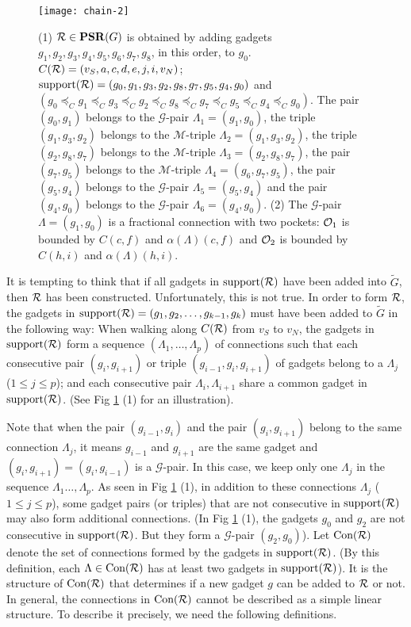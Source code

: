 \documentclass[11pt]{article}
\newcommand{\R}{{\cal R}}
\newcommand{\OO}{{\cal O}}
\newcommand{\MM}{\mathcal{M}}
\newcommand{\GG}{\mathcal{G}}
\newcommand{\CON}{\mbox{Con}}
\newcommand{\PSR}{\mathbf{PSR}}
\begin{document}
\begin{figure}[t]
\begin{center}
\texttt{[image: chain-2]}
  \centering
\caption{(1) $\R \in \PSR(G)$ is obtained by adding gadgets
$g_1, g_2, g_3, g_4, g_5, g_6, g_7,g_8$, in this order, to $g_0$.
$C(\R)=(v_S, a, c, d, e, j, i, v_N)$;
$\mbox{support}(\R) = (g_0, g_1, g_3, g_2, g_8, g_7, g_5, g_4, g_0)$ and
$(g_0 \preceq_C g_1 \preceq_C g_3 \preceq_C g_2 \preceq_C g_8 \preceq_C g_7 \preceq_C g_5 \preceq_C g_4\preceq_C g_0)$.
The pair $(g_0, g_1)$ belongs to the $\GG$-pair $\Lambda_1=(g_1,g_0)$,
the triple $(g_1, g_3, g_2)$ belongs to the $\MM$-triple
$\Lambda_2=(g_1, g_3, g_2)$, the triple $(g_2, g_8, g_7)$ belongs to the
$\MM$-triple $\Lambda_3=(g_2,g_8,g_7)$,
the pair $(g_7,g_5)$ belongs to the $\MM$-triple $\Lambda_4=(g_6,g_7,g_5)$,
the pair $(g_5, g_4)$ belongs to the $\GG$-pair $\Lambda_5=(g_5, g_4)$ and
the pair $(g_4, g_0)$ belongs to the $\GG$-pair $\Lambda_6=(g_4, g_0)$.
(2) The $\GG$-pair $\Lambda=(g_1, g_0)$ is a fractional connection
with two pockets: $\OO_1$ is bounded by $C(c,f)$ and $\alpha(\Lambda)(c,f)$
and $\OO_2$ is bounded by $C(h,i)$ and $\alpha(\Lambda)(h,i)$.
}
\label{fig:chain}
\end{center}
\vspace{-0.2in}
\end{figure}
It is tempting to think that if all gadgets in $\mbox{support}(\R)$ have
been added into $\tilde{G}$, then $\R$ has been constructed. Unfortunately,
this is not true. In order to form $\R$, the gadgets in $\mbox{support}(\R)
=(g_1, g_2,\ldots, g_{k-1}, g_k)$
must have been added to $\tilde{G}$ in the following way: When walking
along $C(\R)$ from $v_S$ to $v_N$, the gadgets in $\mbox{support}(\R)$
form a sequence $(\Lambda_1,\ldots,\Lambda_p)$
of connections such that each consecutive pair $(g_i,g_{i+1})$ or
triple $(g_{i-1},g_i,g_{i+1})$ of gadgets belong to a $\Lambda_j$
($1\leq j\leq p$); and each consecutive pair $\Lambda_i,\Lambda_{i+1}$
share a common gadget in $\mbox{support}(\R)$.
(See Fig \ref{fig:chain} (1) for an illustration).

Note that when the pair $(g_{i-1},g_i)$ and the pair $(g_i,g_{i+1})$
belong to the same connection $\Lambda_j$, it means $g_{i-1}$ and $g_{i+1}$
are the same gadget and $(g_i,g_{i+1})=(g_i,g_{i-1})$ is a $\GG$-pair.
In this case, we keep only one $\Lambda_j$ in the sequence
$\Lambda_1 \ldots, \Lambda_p$.
As seen in Fig \ref{fig:chain} (1), in addition to these connections
$\Lambda_j$ ($1 \leq j\leq p$), some gadget pairs (or triples) that are not
consecutive in $\mbox{support}(\R)$ may also form additional connections.
(In Fig \ref{fig:chain} (1), the gadgets $g_0$ and $g_2$ are not consecutive
in $\mbox{support}(\R)$. But they form a $\GG$-pair $(g_2,g_0)$). Let $\CON(\R)$
denote the set of connections formed by the gadgets in $\mbox{support}(\R)$.
(By this definition, each $\Lambda \in \CON(\R)$ has at least two
gadgets in $\mbox{support}(\R)$).
It is the structure of $\CON(\R)$ that determines if a new gadget $g$ can be
added to $\R$ or not. In general, the connections in $\CON(\R)$ cannot be
described as a simple linear structure. To describe it precisely, we need the
following definitions.
\end{document}
